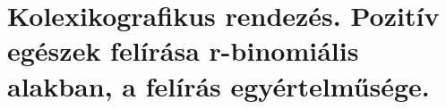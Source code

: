 \chapter{Kolexikografikus rendezés. Pozitív egészek felírása r-binomiális alakban, a felírás egyértelműsége.}








